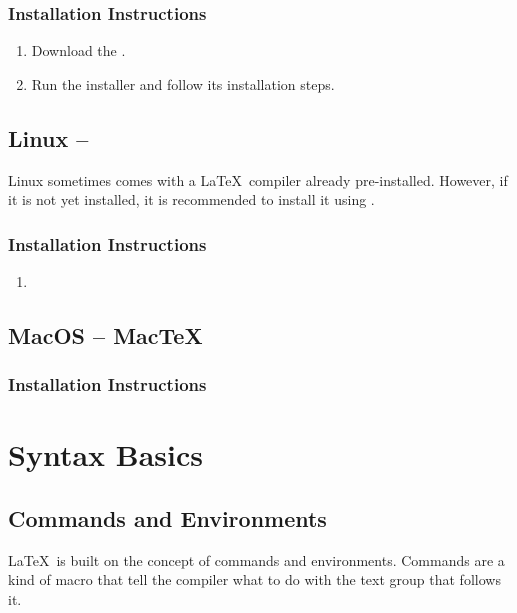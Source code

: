 \subsubsection{Installation Instructions}
\begin{enumerate}
    \item Download the .
    \item Run the installer and follow its installation steps.
\end{enumerate}


\subsection{Linux -- }
Linux sometimes comes with a \LaTeX\ compiler already pre-installed.
However, if it is not yet installed, it is recommended to install it using .


\subsubsection{Installation Instructions} %
\begin{enumerate}
    \item 
\end{enumerate}



\subsection{MacOS -- Mac\TeX} %
\subsubsection{Installation Instructions}


\section{Syntax Basics}
\subsection{Commands and Environments}
\LaTeX\ is built on the concept of commands and environments.
Commands are a kind of macro that tell the compiler what to do with the text group that follows it.


